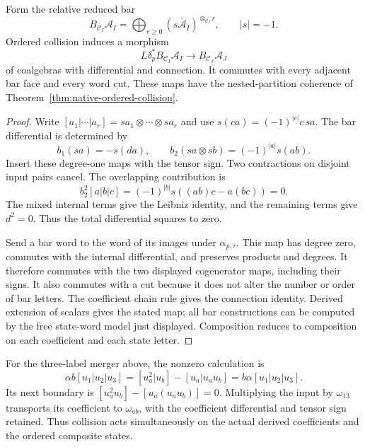 \begin{theorem}
\label{thm:native-collision-bar}
Form the relative reduced bar
\[
 B_{\mathcal C_I}\mathcal A_I
 =\bigoplus_{r\ge0}(s\overline{\mathcal A}_I)
                      ^{\otimes_{\mathcal C_I}r},\qquad |s|=-1.
\]
Ordered collision induces a morphism
\[
 L\delta_p^*B_{\mathcal C_I}\mathcal A_I
 \longrightarrow B_{\mathcal C_J}\mathcal A_J
\]
of coalgebras with differential and connection. It commutes with
every adjacent bar face and every word cut. These maps have the
nested-partition coherence of
Theorem~\ref{thm:native-ordered-collision}.
\end{theorem}
\begin{proof}
Write $[a_1|\cdots|a_r]=sa_1\otimes\cdots\otimes sa_r$ and use
$s(ca)=(-1)^{|c|}c\,sa$. The bar differential is determined by
\[
 b_1(sa)=-s(da),\qquad b_2(sa\otimes sb)=(-1)^{|a|}s(ab).
\]
Insert these degree-one maps with the tensor sign. Two contractions
on disjoint input pairs cancel. The overlapping contribution is
\[
 b_2^2[a|b|c]=(-1)^{|b|}s((ab)c-a(bc))=0.
\]
The mixed internal terms give the Leibniz identity, and the remaining
terms give $d^2=0$. Thus the total differential squares to zero.

Send a bar word to the word of its images under $\alpha_{p,\tau}$.
This map has degree zero, commutes with the internal differential,
and preserves products and degrees. It therefore commutes with
the two displayed cogenerator maps, including their signs.
It also commutes with a cut because it does not alter the number
or order of bar letters. The coefficient chain rule gives the
connection identity. Derived extension of scalars gives the stated
map; all bar constructions can be computed by the free state-word
model just displayed. Composition reduces to composition on each
coefficient and each state letter.
\end{proof}

For the three-label merger above, the nonzero calculation is
\[
 \alpha b[u_1|u_2|u_3]
 =[u_a^2|u_b]-[u_a|u_au_b]
 =b\alpha[u_1|u_2|u_3].
\]
Its next boundary is $[u_a^2u_b]-[u_a(u_au_b)]=0$.
Multiplying the input by $\omega_{13}$ transports its coefficient
to $\omega_{ab}$, with the coefficient differential and tensor
sign retained. Thus collision acts simultaneously on the actual
derived coefficients and the ordered composite states.

